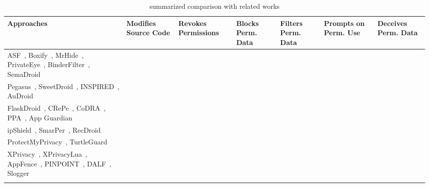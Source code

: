 \begin{table*}[htbp]
    \caption{\framework{} summarized comparison with related works}
    \begin{center}
    \begin{tabular}{|L{5.7cm}|M{1.6cm}|M{1.5cm}|M{1.4cm}|M{1.4cm}|M{1.5cm}|M{1.4cm}|}
    \hline
    \centering\textbf{Approaches} & \textbf{Modifies Source Code} & \textbf{Revokes Permissions} & \textbf{Blocks Perm. Data} & \textbf{Filters Perm. Data} & \textbf{Prompts on Perm. Use} & \textbf{Deceives Perm. Data}  \\ 
    \hline
    ASF~\cite{backes2014android}, Boxify~\cite{backes2015boxify}, MrHide~\cite{jeon2012dr}, PrivateEye~\cite{raval2016you},  BinderFilter~\cite{wu2017context}, SemaDroid~\cite{xu2015semadroid} &  &  &  &  &  &   \\
    \hline
    Pegasus~\cite{chen2013contextual}, SweetDroid~\cite{chen2017sweetdroid}, INSPIRED~\cite{fu2017inspired}, AuDroid~\cite{petracca2015audroid} &  &  &  &  &  &  \\
    \hline

    FlaskDroid~\cite{bugiel2013flexible}, CRePe~\cite{conti2011crepe}, CoDRA~\cite{thanigaivelan2018codra}, PPA~\cite{liu2016follow}, App Guardian~\cite{zhang2015leave} &  &  &  &  &  &  \\
    \hline
    ipShield~\cite{chakraborty2014ipshield}, SmarPer~\cite{olejnik2017smarper}, RecDroid~\cite{rashidi2016android} &  &  &  &  &  &  \\
    \hline
    ProtectMyPrivacy~\cite{chitkara2017does}, TurtleGuard~\cite{tsai2017turtle} &  &  &  &  &  &  \\
    \hline
    XPrivacy~\cite{bokhorst2017xprivacy}, XPrivacyLua~\cite{bokhorst2021xprivacylua}, AppFence~\cite{hornyack2011these}, PINPOINT~\cite{ratazzi2019pinpoint}, DALF~\cite{raval2019permissions}, Slogger~\cite{shrestha2016slogger} &  &  &  &  &  &  \\
    \hline
    
    \framework{} &  &  &  &  &  &  \\
    \hline
    \end{tabular}
    \label{tab:deceiverRelatedWorkComparison}
    \end{center}
\end{table*}